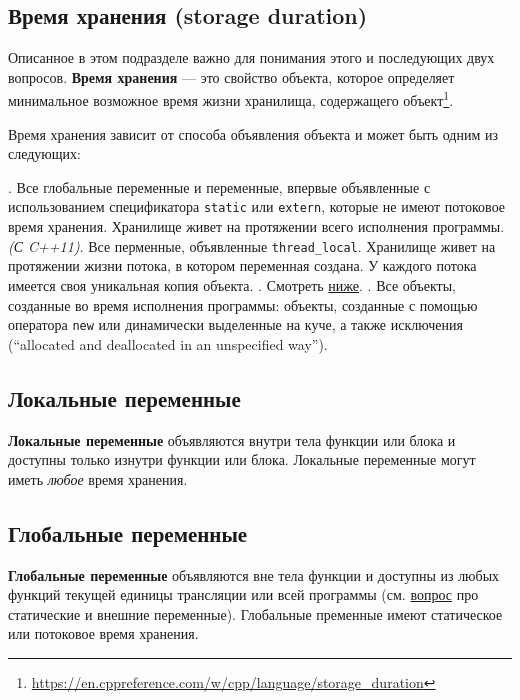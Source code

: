 \documentclass[14pt, a4paper]{extarticle}
\begin{document}
\subsection*{Время хранения (storage duration)}
Описанное в этом подразделе важно для понимания этого и последующих двух вопросов.
\textbf{Время хранения} --- это свойство объекта, которое определяет минимальное
возможное время жизни хранилища, содержащего объект\footnote{\url{https://en.cppreference.com/w/cpp/language/storage_duration}}.

Время хранения зависит от способа объявления объекта и может быть одним из следующих:
\begin{itemize}
  . Все глобальные переменные и переменные, впервые объявленные с использованием
  спецификатора \verb|static| или \verb|extern|, которые не имеют потоковое время хранения.
  Хранилище живет на протяжении всего исполнения программы.
   {\small\textit{(С C++11)}}. Все перменные, объявленные \verb|thread_local|.
  Хранилище живет на протяжении жизни потока, в котором переменная создана. У каждого потока имеется
  своя уникальная копия объекта.
  . Смотреть \hyperref[def:auto_storage]{ниже}.
  . Все объекты, созданные во время исполнения программы:
  объекты, созданные с помощью оператора \verb|new| или динамически выделенные на куче,
  а также исключения (``allocated and deallocated in an unspecified way'').
\end{itemize}

\subsection*{Локальные переменные}
\textbf{Локальные переменные} объявляются внутри тела функции или блока и доступны только изнутри
функции или блока. Локальные переменные могут иметь \textit{любое} время хранения.

\subsection*{Глобальные переменные}
\textbf{Глобальные переменные} объявляются вне тела функции и доступны из любых функций
текущей единицы трансляции или всей программы (см. \hyperref[sec:ext_stat]{вопрос} про
статические и внешние переменные).
Глобальные пременные имеют статическое или потоковое время хранения.
\end{document}
